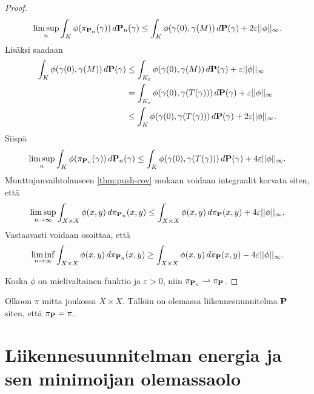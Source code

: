 \documentclass[12pt,oneside,a4paper]{amsbook} %
\begin{document}
\begin{proof}
    \begin{align*}
        \limsup_{n} \int_{K} \phi(\pi_{\P_n}(\gamma)) \, d\P_n (\gamma) \le \int_{K} \phi(\gamma(0),\gamma(M)) \, d\P (\gamma) + 2\varepsilon||\phi||_\infty.
    \end{align*}
Lisäksi saadaan
    \begin{align*}
        \int_K \phi(\gamma(0),\gamma(M)) \, d\P (\gamma) &\le \int_{K_\varepsilon} \phi(\gamma(0),\gamma(M)) \, d\P (\gamma) + \varepsilon||\phi||_\infty \\
        &=\int_{K_\varepsilon} \phi(\gamma(0),\gamma(T(\gamma))) \, d\P (\gamma) + \varepsilon||\phi||_\infty \\
        &\le \int_{K} \phi(\gamma(0),\gamma(T(\gamma))) \, d\P (\gamma) + 2\varepsilon||\phi||_\infty.
    \end{align*}
Siispä
    \begin{equation*}
        \limsup_{n} \int_{K} \phi(\pi_{\P_n}(\gamma)) \, d\P_n (\gamma) \le \int_{K} \phi(\gamma(0),\gamma(T(\gamma))) \, d\P (\gamma) + 4\varepsilon||\phi||_\infty.
    \end{equation*}
Muuttujanvaihtolauseen \ref{thm:push-cov} mukaan voidaan integraalit korvata siten, että
    \begin{equation*}
        \limsup_{n\to\infty} \int_{X \times X} \phi(x, y) \, d\pi_{\P_n} (x, y) \le \int_{X \times X} \phi(x, y) \, d\pi_{\P} (x, y) + 4\varepsilon||\phi||_\infty.
    \end{equation*}
Vastaavasti voidaan osoittaa, että 
    \begin{equation*}
        \liminf_{n\to\infty} \int_{X \times X} \phi(x, y) \, d\pi_{\P_n} (x, y) \ge \int_{X \times X} \phi(x, y) \, d\pi_{\P} (x, y) - 4\varepsilon||\phi||_\infty.
    \end{equation*}

Koska $\phi$ on mielivaltainen funktio ja $\varepsilon > 0$, niin $\pi_{\P_n} \rightharpoonup \pi_\P$.
\end{proof}

\begin{corollary}
    Olkoon $\pi$ mitta joukossa $X \times X$. Tällöin on olemassa liikennesuunnitelma $\P$ siten, että $\pi_\P = \pi$.
\end{corollary}

\chapter{Liikennesuunnitelman energia ja sen minimoijan olemassaolo}
\end{document}
